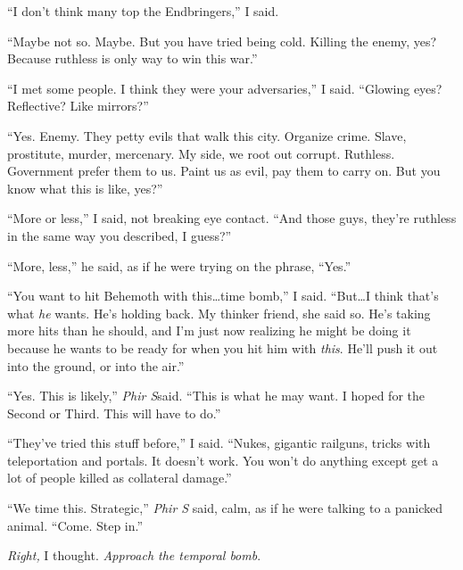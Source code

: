 ``I don't think many top the Endbringers,'' I said.



``Maybe not so.  Maybe.  But you have tried being cold.  Killing the enemy, yes?  Because ruthless is only way to win this war.''



``I met some people.  I think they were your adversaries,'' I said.  ``Glowing eyes?  Reflective?  Like mirrors?''



``Yes.  Enemy.  They petty evils that walk this city.  Organize crime.  Slave, prostitute, murder, mercenary.  My side, we root out corrupt.  Ruthless.  Government prefer them to us.  Paint us as evil, pay them to carry on.  But you know what this is like, yes?''



``More or less,'' I said, not breaking eye contact.  ``And those guys, they're ruthless in the same way you described, I guess?''



``More, less,'' he said, as if he were trying on the phrase, ``Yes.''



``You want to hit Behemoth with this\ldots time bomb,'' I said.  ``But\ldots I think that's what \emph{he} wants.  He's holding back.  My thinker friend, she said so.  He's taking more hits than he should, and I'm just now realizing he might be doing it because he wants to be ready for when you hit him with \emph{this}.  He'll push it out into the ground, or into the air.''



``Yes.  This is likely,'' \emph{Phir S}said.  ``This is what he may want.  I hoped for the Second or Third.  This will have to do.''



``They've tried this stuff before,'' I said.  ``Nukes, gigantic railguns, tricks with teleportation and portals.  It doesn't work.  You won't do anything except get a lot of people killed as collateral damage.''



``We time this.  Strategic,'' \emph{Phir S}\emph{ }said, calm, as if he were talking to a panicked animal.  ``Come.  Step in.''



\emph{Right,} I thought.  \emph{Approach the temporal bomb}.



